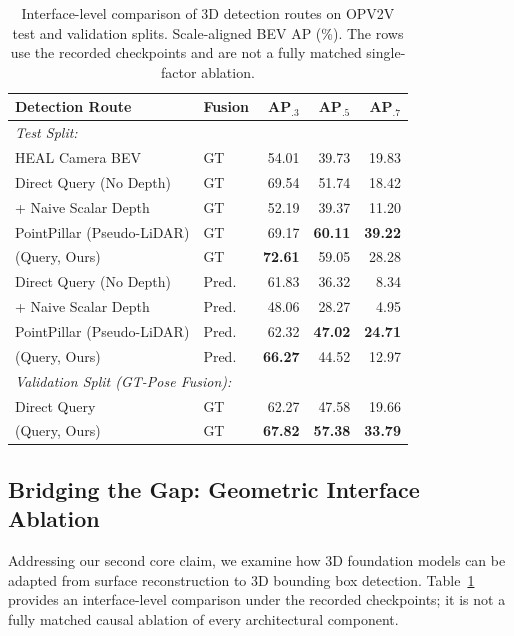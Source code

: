 \begin{table}[t]
\centering\footnotesize
\setlength{\tabcolsep}{3pt}
\caption{Interface-level comparison of 3D detection routes on OPV2V test and validation splits. Scale-aligned BEV AP (\%). The rows use the recorded checkpoints and are not a fully matched single-factor ablation.}
\label{tab:main}
\begin{tabular}{llrrr}\toprule
Detection Route & Fusion & AP$_{.3}$ & AP$_{.5}$ & AP$_{.7}$\\\midrule
\multicolumn{5}{l}{\textit{Test Split:}} \\
HEAL Camera BEV~\cite{heal} & GT & 54.01 & 39.73 & 19.83\\
Direct Query (No Depth) & GT & 69.54 & 51.74 & 18.42\\
+ Naive Scalar Depth & GT & 52.19 & 39.37 & 11.20\\
PointPillar (Pseudo-LiDAR) & GT & 69.17 & \textbf{60.11} & \textbf{39.22}\\
\method{} (Query, Ours) & GT & \textbf{72.61} & 59.05 & 28.28\\\midrule
Direct Query (No Depth) & Pred. & 61.83 & 36.32 & 8.34\\
+ Naive Scalar Depth & Pred. & 48.06 & 28.27 & 4.95\\
PointPillar (Pseudo-LiDAR) & Pred. & 62.32 & \textbf{47.02} & \textbf{24.71}\\
\method{} (Query, Ours) & Pred. & \textbf{66.27} & 44.52 & 12.97\\\midrule
\multicolumn{5}{l}{\textit{Validation Split (GT-Pose Fusion):}} \\
Direct Query & GT & 62.27 & 47.58 & 19.66\\
\method{} (Query, Ours) & GT & \textbf{67.82} & \textbf{57.38} & \textbf{33.79}\\\bottomrule
\end{tabular}
\end{table}

\subsection{Bridging the Gap: Geometric Interface Ablation}
\label{sec:ablation}
Addressing our second core claim, we examine how 3D foundation models can be adapted from surface reconstruction to 3D bounding box detection. Table~\ref{tab:main} provides an interface-level comparison under the recorded checkpoints; it is not a fully matched causal ablation of every architectural component.

